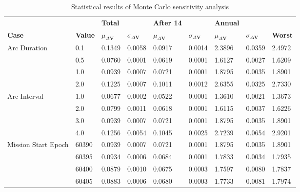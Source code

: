 \begin{table}[H]
\centering
\begin{tabular}{lllllllll}
 &  & \cellcolor[HTML]{EFEFEF}\textbf{Total} &  & \cellcolor[HTML]{EFEFEF}\textbf{After 14} & & \cellcolor[HTML]{EFEFEF}\textbf{Annual} & &\\
\rowcolor[HTML]{EFEFEF} 
\textbf{Case} & \textbf{Value} & \textbf{$\mu_{\Delta \boldsymbol{V}}$} & \textbf{$\sigma_{\Delta \boldsymbol{V}}$} & \textbf{$\mu_{\Delta \boldsymbol{V}}$} & \textbf{$\sigma_{\Delta \boldsymbol{V}}$} & \textbf{$\mu_{\Delta \boldsymbol{V}}$} & \textbf{$\sigma_{\Delta \boldsymbol{V}}$} & \textbf{Worst} \\ 
Arc Duration & 0.1 & 0.1349 & 0.0058 & 0.0917 & 0.0014 & 2.3896 & 0.0359 & 2.4972 \\ 
 & 0.5 & 0.0760 & 0.0001 & 0.0619 & 0.0001 & 1.6127 & 0.0027 & 1.6209 \\ 
 & 1.0 & 0.0939 & 0.0007 & 0.0721 & 0.0001 & 1.8795 & 0.0035 & 1.8901 \\ 
 & 2.0 & 0.1225 & 0.0007 & 0.1011 & 0.0012 & 2.6355 & 0.0325 & 2.7330 \\ 
Arc Interval & 1.0 & 0.0677 & 0.0002 & 0.0522 & 0.0001 & 1.3610 & 0.0021 & 1.3673 \\ 
 & 2.0 & 0.0799 & 0.0011 & 0.0618 & 0.0001 & 1.6115 & 0.0037 & 1.6226 \\ 
 & 3.0 & 0.0939 & 0.0007 & 0.0721 & 0.0001 & 1.8795 & 0.0035 & 1.8901 \\ 
 & 4.0 & 0.1256 & 0.0054 & 0.1045 & 0.0025 & 2.7239 & 0.0654 & 2.9201 \\ 
Mission Start Epoch & 60390 & 0.0939 & 0.0007 & 0.0721 & 0.0001 & 1.8795 & 0.0035 & 1.8901 \\ 
 & 60395 & 0.0934 & 0.0006 & 0.0684 & 0.0001 & 1.7833 & 0.0034 & 1.7935 \\ 
 & 60400 & 0.0879 & 0.0010 & 0.0675 & 0.0003 & 1.7597 & 0.0080 & 1.7837 \\ 
 & 60405 & 0.0883 & 0.0006 & 0.0680 & 0.0003 & 1.7733 & 0.0081 & 1.7974 \\ 
\end{tabular}
\caption{Statistical results of Monte Carlo sensitivity analysis}
\label{tab:SensitivityAnalysis}
\end{table}